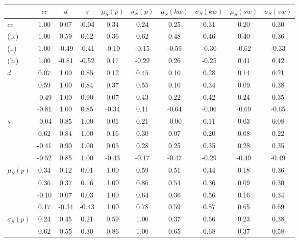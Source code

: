\begin{table*}[h!]
\begin{center}
\begin{tabular}{| l | c | c | c | c | c | c | c | c | c |}\hline
 & $cc$ & $d$ & $s$ & $\mu_S(p)$ & $\sigma_S(p)$ & $\mu_S(kw)$ & $\sigma_S(kw)$ & $\mu_S(sw)$ & $\sigma_S(sw)$ \\\hline
$cc$ & 1.00  & 0.07  & -0.04  & 0.34  & 0.24  & 0.25  & 0.31  & 0.20  & 0.30 \\\hline
(p.) & 1.00  & 0.59  & 0.62  & 0.36  & 0.62  & 0.48  & 0.46  & 0.40  & 0.36 \\\hline
(i.) & 1.00  & -0.49  & -0.41  & -0.10  & -0.15  & -0.59  & -0.30  & -0.62  & -0.33 \\\hline
(h.) & 1.00  & -0.81  & -0.52  & 0.17  & -0.29  & 0.26  & -0.25  & 0.41  & 0.42 \\\hline
$d$ & 0.07  & 1.00  & 0.85  & 0.12  & 0.45  & 0.10  & 0.28  & 0.14  & 0.21 \\\hline
 & 0.59  & 1.00  & 0.84  & 0.37  & 0.55  & 0.10  & 0.34  & 0.09  & 0.38 \\\hline
 & -0.49  & 1.00  & 0.90  & 0.07  & 0.43  & 0.22  & 0.42  & 0.24  & 0.35 \\\hline
 & -0.81  & 1.00  & 0.85  & -0.34  & 0.11  & -0.64  & -0.06  & -0.69  & -0.65 \\\hline
$s$ & -0.04  & 0.85  & 1.00  & 0.01  & 0.21  & -0.00  & 0.11  & 0.03  & 0.08 \\\hline
 & 0.62  & 0.84  & 1.00  & 0.16  & 0.30  & 0.07  & 0.20  & 0.08  & 0.22 \\\hline
 & -0.41  & 0.90  & 1.00  & 0.03  & 0.28  & 0.25  & 0.35  & 0.28  & 0.35 \\\hline
 & -0.52  & 0.85  & 1.00  & -0.43  & -0.17  & -0.47  & -0.29  & -0.49  & -0.49 \\\hline
$\mu_S(p)$ & 0.34  & 0.12  & 0.01  & 1.00  & 0.59  & 0.51  & 0.44  & 0.18  & 0.36 \\\hline
 & 0.36  & 0.37  & 0.16  & 1.00  & 0.86  & 0.54  & 0.36  & 0.09  & 0.30 \\\hline
 & -0.10  & 0.07  & 0.03  & 1.00  & 0.64  & 0.36  & 0.56  & 0.16  & 0.34 \\\hline
 & 0.17  & -0.34  & -0.43  & 1.00  & 0.78  & 0.59  & 0.87  & 0.65  & 0.69 \\\hline
$\sigma_S(p)$ & 0.24  & 0.45  & 0.21  & 0.59  & 1.00  & 0.37  & 0.66  & 0.23  & 0.38 \\\hline
 & 0.62  & 0.55  & 0.30  & 0.86  & 1.00  & 0.65  & 0.68  & 0.37  & 0.58 \\\hline

\end{tabular}
\end{center}
\end{table*}
